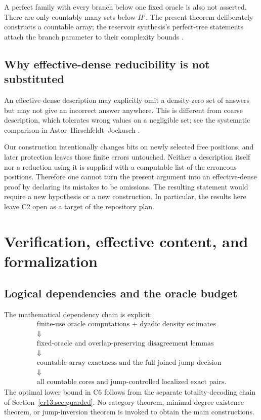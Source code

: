 \documentclass[11pt,letterpaper]{article}
\theoremstyle{definition}
\theoremstyle{remark}\newtheorem{remark}[theorem]{Remark}
\numberwithin{equation}{section}
\begin{document}
A perfect family with every branch below one fixed oracle is also not asserted. There are only countably many sets below $H'$. The present theorem deliberately constructs a countable array; the reservoir synthesis's perfect-tree statements attach the branch parameter to their complexity bounds \cite{Synthesis}.

\subsection{Why effective-dense reducibility is not substituted}\label{cr13:sec:ednot}
An effective-dense description may explicitly omit a density-zero set of answers but may not give an incorrect answer anywhere. This is different from coarse description, which tolerates wrong values on a negligible set; see the systematic comparison in Astor--Hirschfeldt--Jockusch \cite{AHJ}.

Our construction intentionally changes bits on newly selected free positions, and later protection leaves those finite errors untouched. Neither a description itself nor a reduction using it is supplied with a computable list of the erroneous positions. Therefore one cannot turn the present argument into an effective-dense proof by declaring its mistakes to be omissions. The resulting statement would require a new hypothesis or a new construction. In particular, the results here leave C2 open as a target of the repository plan.

\section{Verification, effective content, and formalization}
\label{cr13:sec:verification}
\subsection{Logical dependencies and the oracle budget}
The mathematical dependency chain is explicit:
\[
\begin{gathered}
 \text{finite-use oracle computations + dyadic density estimates}\\
 \Downarrow\\
 \text{fixed-oracle and overlap-preserving disagreement lemmas}\\
 \Downarrow\\
 \text{countable-array exactness and the full joined jump decision}\\
 \Downarrow\\
 \text{all countable cores and jump-controlled localized exact pairs}.
\end{gathered}
\]
The optimal lower bound in C6 follows from the separate totality-decoding chain of Section~\ref{cr13:sec:guarded}. No category theorem, minimal-degree existence theorem, or jump-inversion theorem is invoked to obtain the main constructions.
\end{document}
